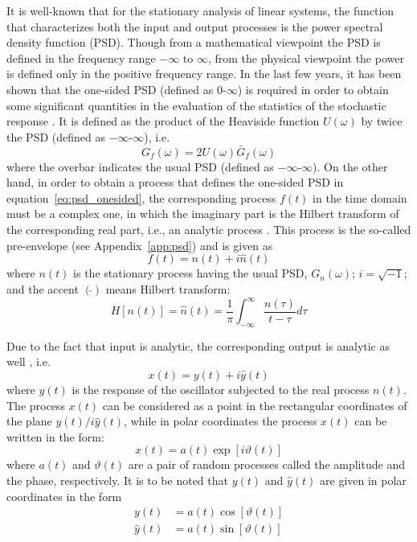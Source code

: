 \documentclass[11pt]{article}
\begin{document}
It is well-known that for the stationary analysis of linear systems, the function that characterizes both the input and output processes is the power spectral density function (PSD). Though from a mathematical viewpoint the PSD is defined in the frequency range $-\infty$ to $\infty$, from the physical viewpoint the power is defined only in the positive frequency range. In the last few years, it has been shown that the one-sided PSD (defined as $0$-$\infty$) is required in order to obtain some significant quantities in the evaluation of the statistics of the stochastic response \cite{vanmarcke1972,vanmarcke1975}. It is defined as the product of the Heaviside function $U(\omega)$ by twice the PSD (defined as $-\infty$-$\infty$), i.e.
\begin{equation}
G_f(\omega) = 2U(\omega)\bar{G}_f(\omega)
\label{eq:psd_onesided}
\end{equation}
where the overbar indicates the usual PSD (defined as $-\infty$-$\infty$). On the other hand, in order to obtain a process that defines the one-sided PSD in equation~\eqref{eq:psd_onesided}, the corresponding process $f(t)$ in the time domain must be a complex one, in which the imaginary part is the Hilbert transform of the corresponding real part, i.e., an analytic process \cite{dipaola1985}. This process is the so-called pre-envelope \cite{arens1957,dugundji1958} (see Appendix~\ref{app:psd}) and is given as
\begin{equation}
f(t) = n(t) + i\hat{n}(t)
\label{eq:preenvelope}
\end{equation}
where $n(t)$ is the stationary process having the usual PSD, $G_n(\omega)$; $i = \sqrt{-1}$; and the accent $(\hat{})$ means Hilbert transform:
\begin{equation}
H[n(t)] = \hat{n}(t) = \frac{1}{\pi} \int_{-\infty}^{\infty} \frac{n(\tau)}{t-\tau} d\tau
\label{eq:hilbert}
\end{equation}

Due to the fact that input is analytic, the corresponding output is analytic as well \cite{krenk1981}, i.e.
\begin{equation}
x(t) = y(t) + i\hat{y}(t)
\label{eq:output_analytic}
\end{equation}
where $y(t)$ is the response of the oscillator subjected to the real process $n(t)$. The process $x(t)$ can be considered as a point in the rectangular coordinates of the plane $y(t)/i\hat{y}(t)$, while in polar coordinates the process $x(t)$ can be written in the form:
\begin{equation}
x(t) = a(t) \exp[i\vartheta(t)]
\label{eq:polar}
\end{equation}
where $a(t)$ and $\vartheta(t)$ are a pair of random processes called the amplitude and the phase, respectively. It is to be noted that $y(t)$ and $\hat{y}(t)$ are given in polar coordinates in the form
\begin{align}
y(t) &= a(t) \cos[\vartheta(t)] \label{eq:polar_y}\\
\hat{y}(t) &= a(t) \sin[\vartheta(t)] \label{eq:polar_yhat}
\end{align}
\end{document}
